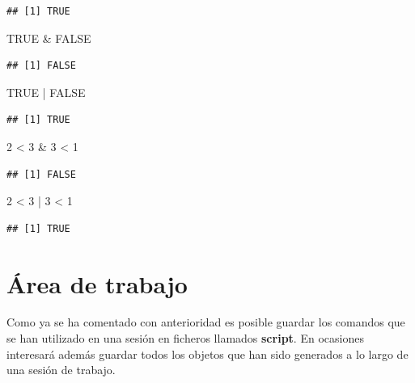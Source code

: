 \documentclass[
]{book}
\newenvironment{Shaded}{\begin{snugshade}}{\end{snugshade}}
\newcommand{\ConstantTok}[1]{\textcolor[rgb]{0.00,0.00,0.00}{#1}}
\newcommand{\DecValTok}[1]{\textcolor[rgb]{0.00,0.00,0.81}{#1}}
\newcommand{\SpecialCharTok}[1]{\textcolor[rgb]{0.00,0.00,0.00}{#1}}
\theoremstyle{break}
\begin{document}
\begin{verbatim}
## [1] TRUE
\end{verbatim}

\begin{Shaded}
\begin{Highlighting}[]
\ConstantTok{TRUE} \SpecialCharTok{\&} \ConstantTok{FALSE}
\end{Highlighting}
\end{Shaded}

\begin{verbatim}
## [1] FALSE
\end{verbatim}

\begin{Shaded}
\begin{Highlighting}[]
\ConstantTok{TRUE} \SpecialCharTok{|} \ConstantTok{FALSE}
\end{Highlighting}
\end{Shaded}

\begin{verbatim}
## [1] TRUE
\end{verbatim}

\begin{Shaded}
\begin{Highlighting}[]
\DecValTok{2} \SpecialCharTok{\textless{}} \DecValTok{3} \SpecialCharTok{\&} \DecValTok{3} \SpecialCharTok{\textless{}} \DecValTok{1}
\end{Highlighting}
\end{Shaded}

\begin{verbatim}
## [1] FALSE
\end{verbatim}

\begin{Shaded}
\begin{Highlighting}[]
\DecValTok{2} \SpecialCharTok{\textless{}} \DecValTok{3} \SpecialCharTok{|} \DecValTok{3} \SpecialCharTok{\textless{}} \DecValTok{1}
\end{Highlighting}
\end{Shaded}

\begin{verbatim}
## [1] TRUE
\end{verbatim}

\hypertarget{uxe1rea-de-trabajo}{%
\section{Área de trabajo}\label{uxe1rea-de-trabajo}}

Como ya se ha comentado
con anterioridad es posible guardar los comandos que se han utilizado en
una sesión en ficheros llamados \textbf{script}. En ocasiones interesará
además guardar todos los objetos que han sido generados a lo largo de
una sesión de trabajo.
\end{document}
